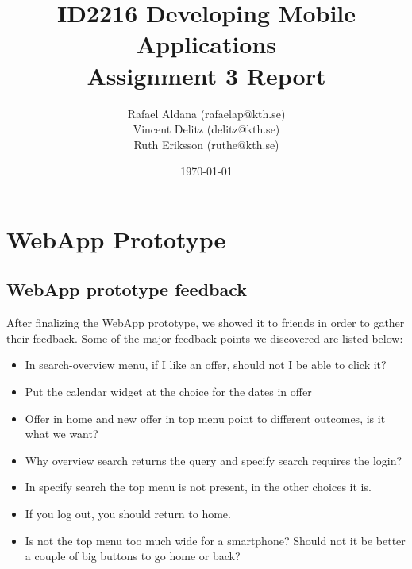 \documentclass[11pt,twoside,a4paper]{report}
\begin{document}
\title{ID2216 Developing Mobile Applications\\Assignment 3 Report}
\author{Rafael Aldana (rafaelap@kth.se)\\Vincent Delitz (delitz@kth.se)\\Ruth Eriksson (ruthe@kth.se)}
\date{\today}
\maketitle



\tableofcontents
\thispagestyle{empty}



\renewcommand{\chaptername}{Assignment}
\setcounter{chapter}{1}
\chapter{WebApp Prototype}
\setcounter{page}{1}

\section{WebApp prototype feedback}

After finalizing the WebApp prototype, we showed it to friends in order to gather their feedback. Some of the major feedback points we discovered are listed below:

\begin{itemize}

\item In search-overview menu, if I like an offer, should not I be able to click it?

\item Put the calendar widget at the choice for the dates in offer

\item Offer in home and new offer in top menu point to different outcomes, is it what we want?

\item Why overview search returns the query and specify search requires the login?

\item In specify search the top menu is not present, in the other choices it is.

\item If you log out, you should return to home.

\item Is not the top menu too much wide for a smartphone? Should not it be better a couple of big buttons to go home or back?

\end{itemize}
\end{document}
